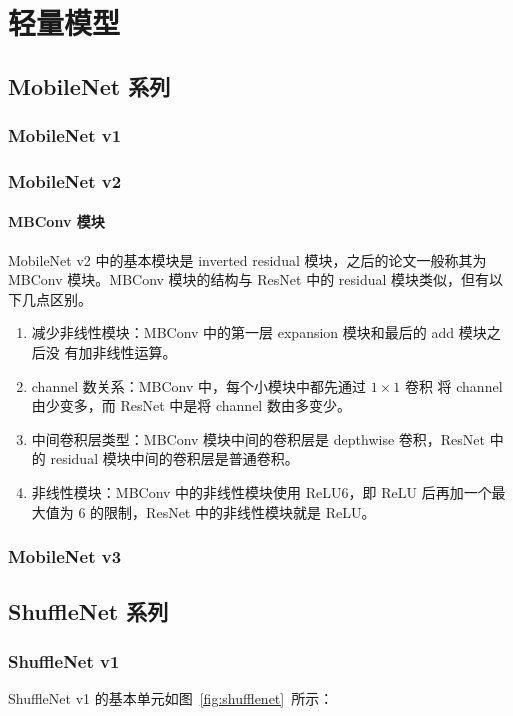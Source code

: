 \chapter{轻量模型}

\section{MobileNet 系列}
\subsection{MobileNet v1}

\subsection{MobileNet v2}
\label{subsec:MobileNetv2}

\subsubsection{MBConv 模块}
MobileNet v2 中的基本模块是 inverted residual 模块，之后的论文一般称其为 MBConv
模块。MBConv 模块的结构与 ResNet 中的 residual 模块类似，但有以下几点区别。

\begin{enumerate}
  \item 减少非线性模块：MBConv 中的第一层 expansion 模块和最后的 add 模块之后没
    有加非线性运算。
  \item channel 数关系：MBConv 中，每个小模块中都先通过 $1 \times 1$ 卷积
    将 channel 由少变多，而 ResNet 中是将 channel 数由多变少。
  \item 中间卷积层类型：MBConv 模块中间的卷积层是 depthwise 卷积，ResNet 中的
    residual 模块中间的卷积层是普通卷积。
  \item 非线性模块：MBConv 中的非线性模块使用 ReLU6，即 ReLU 后再加一个最大值为
    6 的限制，ResNet 中的非线性模块就是 ReLU。
\end{enumerate}

\subsection{MobileNet v3}

\section{ShuffleNet 系列}
\subsection{ShuffleNet v1}
ShuffleNet v1 的基本单元如图~\ref{fig:shufflenet}~所示：

